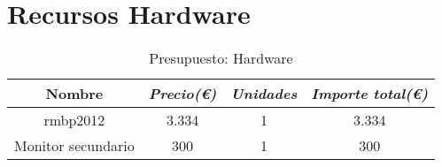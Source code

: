 \section{Recursos Hardware}

\begin{table}[htp]
	\centering
	\caption{Presupuesto: Hardware}\label{tab:budget-hardware}
	\begin{tabular}{cccc}
		\toprule
    	\textbf{Nombre} & \emph{Precio(\euro)} & \emph{Unidades} & \emph{Importe total(\euro)}\\
    	\midrule
    	\acrshort{rmbp}2012			& 	3.334			&	1 			&	3.334					\\
    	Monitor secundario	&	300				&	1			&	300						\\
    	\bottomrule
    \end{tabular}
\end{table}